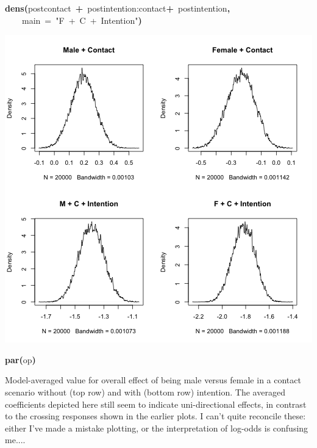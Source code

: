 \documentclass{article}
\makeatletter
\newcommand{\hlfunctioncall}[1]{\textcolor[rgb]{.5,0,.33}{\textbf{#1}}}%
\newcommand{\hlstring}[1]{\textcolor[rgb]{.6,.6,1}{#1}}%
\newcommand{\hlkeyword}[1]{\textbf{#1}}%
\newcommand{\hlargument}[1]{\textcolor[rgb]{.69,.25,.02}{#1}}%
\newcommand{\hlsymbol}[1]{#1}%
\newcommand{\hlstd}[1]{\textcolor[rgb]{0,0,0}{#1}}%
\newenvironment{kframe}{%
 \def\FrameCommand##1{\hskip\@totalleftmargin \hskip-\fboxsep
 \colorbox{shadecolor}{##1}\hskip-\fboxsep
     \hskip-\linewidth \hskip-\@totalleftmargin \hskip\columnwidth}%
 \MakeFramed {\advance\hsize-\width
   \@totalleftmargin\z@ \linewidth\hsize
   \@setminipage}}%
 {\par\unskip\endMakeFramed}
\newenvironment{knitrout}{}{} %
\makeatother
\begin{document}
\begin{knitrout}
{\begin{kframe}
\begin{flushleft}
\hlstd{}\hlfunctioncall{dens}\hlkeyword{(}\hlsymbol{post}\hlkeyword{\usebox{\hlnormalsizeboxdollar}}\hlsymbol{contact}{\ }\hlkeyword{+}{\ }\hlsymbol{post}\hlkeyword{\usebox{\hlnormalsizeboxdollar}}\hlsymbol{\usebox{\hlnormalsizeboxbacktick}intention:contact\usebox{\hlnormalsizeboxbacktick}}{\ }\hlkeyword{+}{\ }\hlsymbol{post}\hlkeyword{\usebox{\hlnormalsizeboxdollar}}\hlsymbol{intention}\hlkeyword{,}\hspace*{\fill}\\
\hlstd{}{\ }{\ }{\ }{\ }\hlargument{main}{\ }\hlargument{=}{\ }\hlstring{"F{\ }+{\ }C{\ }+{\ }Intention"}\hlkeyword{)}\mbox{}
\normalfont
\end{flushleft}
\includegraphics{interact-coef} \begin{flushleft}
\ttfamily\noindent
\hlfunctioncall{par}\hlkeyword{(}\hlsymbol{op}\hlkeyword{)}\mbox{}
\normalfont
\end{flushleft}
\end{kframe}}
\end{knitrout}


Model-averaged value for overall effect of being male versus female in a contact scenario without (top row) and with (bottom row) intention. 
The averaged coefficients depicted here still seem to indicate uni-directional effects, in contrast to the crossing responses shown in the earlier plots. 
I can't quite reconcile these: either I've made a mistake plotting, or the interpretation of log-odds is confusing me....
\end{document}

